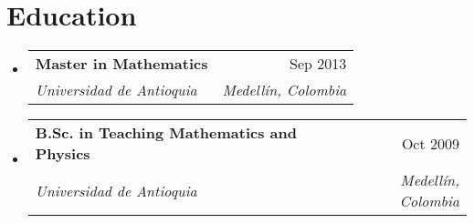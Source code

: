 \documentclass[letterpaper,11pt]{article}
\makeatletter
\newcommand{\resumeSubheading}[4]{
  \vspace{-2pt}
  \item[]
  \begin{tabular*}{\textwidth}{@{\extracolsep{\fill}}l r}
    \textbf{#1} & #2 \\
    \textit{#3} & \textit{#4} \\
  \end{tabular*}
  \vspace{-5pt}
}
\makeatother
\begin{document}
\section{Education}
\begin{itemize}[leftmargin=0pt, itemindent=0pt, label={}]
\resumeSubheading
{Master in Mathematics}{Sep 2013}
{Universidad de Antioquia}{Medellín, Colombia}

\resumeSubheading
{B.Sc. in Teaching Mathematics and Physics}{Oct 2009}
{Universidad de Antioquia}{Medellín, Colombia}
\end{itemize}
\end{document}
